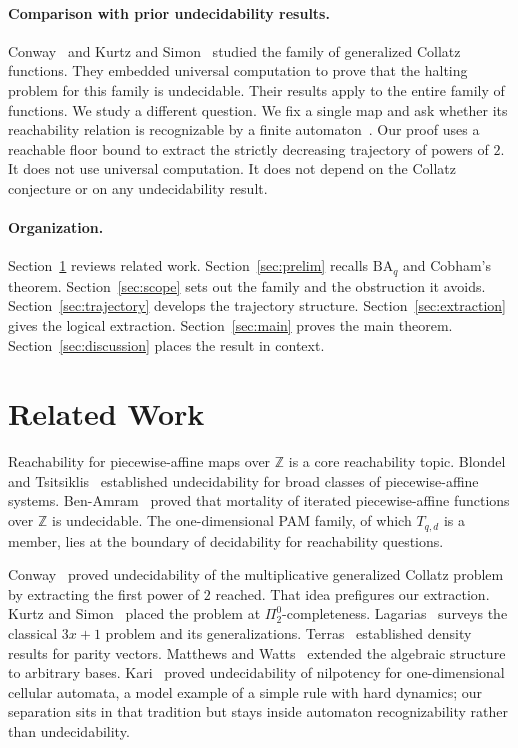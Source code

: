 \documentclass[runningheads]{llncs}
\begin{document}
\paragraph{Comparison with prior undecidability results.}
Conway~\cite{Conway} and Kurtz and Simon~\cite{KurtzSimon} studied the
family of generalized Collatz functions. They embedded universal
computation to prove that the halting problem for this family is
undecidable. Their results apply to the entire family of functions. We
study a different question. We fix a single map and ask whether its
reachability relation is recognizable by a finite
automaton~\cite{Bruyere}. Our proof uses a reachable floor bound to extract
the strictly decreasing trajectory of powers of $2$. It does not use
universal computation. It does not depend on the Collatz conjecture or
on any undecidability result.

\paragraph{Organization.}
Section~\ref{sec:related} reviews related work.
Section~\ref{sec:prelim} recalls $\mathrm{BA}_q$ and Cobham's theorem.
Section~\ref{sec:scope} sets out the family and the obstruction it
avoids. Section~\ref{sec:trajectory} develops the trajectory structure.
Section~\ref{sec:extraction} gives the logical extraction.
Section~\ref{sec:main} proves the main theorem.
Section~\ref{sec:discussion} places the result in context.

\section{Related Work}
\label{sec:related}

Reachability for piecewise-affine maps over $\mathbb{Z}$ is a core
reachability topic. Blondel and Tsitsiklis~\cite{Blondel} established
undecidability for broad classes of piecewise-affine systems.
Ben-Amram~\cite{BenAmram} proved that mortality of iterated
piecewise-affine functions over $\mathbb{Z}$ is undecidable.
The one-dimensional PAM family, of which
$T_{q,d}$ is a member, lies at the boundary of decidability for
reachability questions.

Conway~\cite{Conway} proved undecidability of the multiplicative
generalized Collatz problem by extracting the first power of $2$
reached. That idea prefigures our extraction. Kurtz and
Simon~\cite{KurtzSimon} placed the problem at $\Pi^0_2$-completeness.
Lagarias~\cite{Lagarias} surveys the classical $3x+1$ problem and its
generalizations. Terras~\cite{Terras} established density results for
parity vectors. Matthews and Watts~\cite{MatthewsWatts} extended the
algebraic structure to arbitrary bases. Kari~\cite{Kari} proved
undecidability of nilpotency for one-dimensional cellular automata, a
model example of a simple rule with hard dynamics; our separation sits
in that tradition but stays inside automaton recognizability rather than
undecidability.
\end{document}
